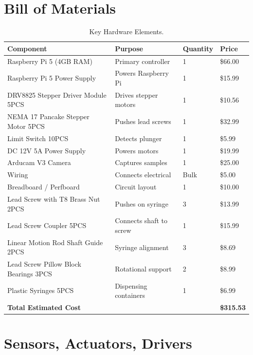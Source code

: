 \documentclass[12pt, letterpaper]{report}
\begin{document}
    \section{Bill of Materials}
    \begin{table}[H]
        \centering
        \begin{tabular}{l l l l}
            \toprule
            Component & Purpose & Quantity & Price \\ 
            \midrule
            Raspberry Pi 5 (4GB RAM) & Primary controller & 1 & \$66.00 \\
            Raspberry Pi 5 Power Supply  & Powers Raspberry Pi & 1 & \$15.99 \\
            DRV8825 Stepper Driver Module 5PCS & Drives stepper motors & 1 & \$10.56 \\
            NEMA 17 Pancake Stepper Motor 5PCS & Pushes lead screws & 1 & \$32.99 \\
            Limit Switch 10PCS & Detects plunger & 1 & \$5.99 \\
            DC 12V 5A Power Supply & Powers motors & 1 & \$19.99 \\
            Arducam V3 Camera & Captures samples & 1 & \$25.00 \\
            Wiring & Connects electrical  & Bulk & \$5.00 \\
            Breadboard / Perfboard & Circuit layout & 1 & \$10.00 \\
            Lead Screw with T8 Brass Nut 2PCS & Pushes on syringe & 3 & \$13.99 \\
            Lead Screw Coupler 5PCS & Connects shaft to screw & 1 & \$15.99 \\
            Linear Motion Rod Shaft Guide 2PCS & Syringe alignment & 3 & \$8.69 \\
            Lead Screw Pillow Block Bearings 3PCS & Rotational support & 2 & \$8.99 \\
            Plastic Syringes 5PCS & Dispensing containers & 1 & \$6.99 \\
            \midrule
            \textbf{Total Estimated Cost} & & & \textbf{\$315.53} \\
            \bottomrule

        \end{tabular}
        \caption{Key Hardware Elements.}
        \label{tab:hardware}
    \end{table}

    \section{Sensors, Actuators, Drivers}
\end{document}
